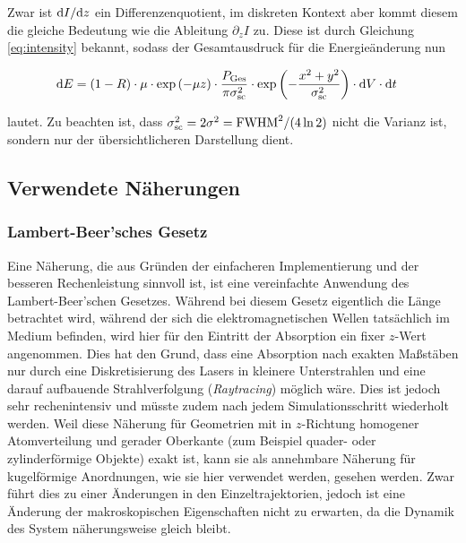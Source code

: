 		Zwar ist $\dx[I]/\dx[z]$ ein Differenzenquotient, im diskreten Kontext aber kommt diesem
		die gleiche Bedeutung wie die Ableitung $\partial_z I$ zu. Diese ist durch Gleichung
		\eqref{eq:intensity} bekannt, sodass der Gesamtausdruck für die Energieänderung nun

		\begin{align}
			\dx[E] &= (1-R) \cdot \mu \cdot \exp\left(-\mu z\right)
				\cdot \frac{P_\text{Ges}}{\pi \sigma_\text{sc}^2}
				\cdot \exp\left(-\frac{x^2 + y^2}{\sigma_\text{sc}^2}\right)
				\cdot \dx[V] \cdot \dt
		\end{align}

		lautet. Zu beachten ist, dass $\sigma_\text{sc}^2 = 2\sigma^2 = \fwhm^2/(4\ln2)$ nicht die
		Varianz ist, sondern nur der übersichtlicheren Darstellung dient.

	\subsection{Verwendete Näherungen}
		\subsubsection{Lambert-Beer'sches Gesetz}
		Eine Näherung, die aus Gründen der einfacheren Implementierung und der besseren
		Rechenleistung sinnvoll ist, ist eine vereinfachte Anwendung des Lambert-Beer'schen
		Gesetzes. Während bei diesem Gesetz eigentlich die Länge betrachtet wird, während der sich
		die elektromagnetischen Wellen tatsächlich im Medium befinden, wird hier für den Eintritt
		der Absorption ein fixer $z$-Wert angenommen. Dies hat den Grund, dass eine Absorption
		nach exakten Maßstäben nur durch eine Diskretisierung des Lasers in kleinere Unterstrahlen
		und eine darauf aufbauende Strahlverfolgung (\emph{Raytracing}) möglich wäre. Dies ist
		jedoch sehr rechenintensiv und müsste zudem nach jedem Simulationsschritt wiederholt
		werden. Weil diese Näherung für Geometrien mit in $z$-Richtung homogener Atomverteilung
		und gerader Oberkante (zum Beispiel quader- oder zylinderförmige Objekte) exakt ist, kann
		sie als annehmbare Näherung für kugelförmige Anordnungen, wie sie hier verwendet werden,
		gesehen werden. Zwar führt dies zu einer Änderungen in den Einzeltrajektorien, jedoch ist
		eine Änderung der makroskopischen Eigenschaften nicht zu erwarten, da die Dynamik des
		System näherungsweise gleich bleibt.

